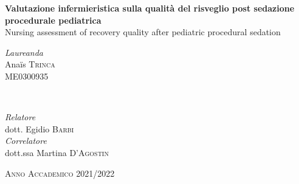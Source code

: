 \begin{titlepage}
\begin{center}
	
	\vfill
	
	{\huge\bfseries Valutazione infermieristica sulla qualità del risveglio post sedazione procedurale pediatrica}\\ [0.2cm] %
	
	{\huge Nursing assessment of recovery quality after pediatric procedural sedation}\\ [0.2cm] %
	
	\vfill\vfill
	
	
	\begin{minipage}{0.4\textwidth}
		\begin{flushleft}
			\large
			\textit{Laureanda}\\
			Ana\"is \textsc{Trinca}\\ %
			\small{ME0300935}
		\end{flushleft}
	\end{minipage}
	~
	\begin{minipage}{0.4\textwidth}
		\begin{flushright}
			\large
			\textit{Relatore}\\
			dott. Egidio \textsc{Barbi} \\ %
			\bigskip
			\textit{Correlatore}\\ 
			dott.ssa Martina \textsc{D'Agostin} \\ %
		\end{flushright}
	\end{minipage}
	
	
	\vfill\vfill\vfill
	
	{\large \textsc{Anno Accademico 2021/2022}}
	
	\vfill
	\end{center}
\end{titlepage}

